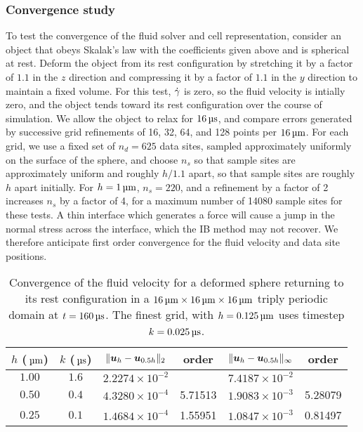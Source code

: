 \subsubsection{Convergence study}
To test the convergence of the fluid solver and cell representation, consider 
an object that obeys Skalak's law with the coefficients given above and is
spherical at rest. Deform the object from its rest configuration by stretching
it by a factor of $1.1$ in the $z$ direction and compressing it by a factor of
$1.1$ in the $y$ direction to maintain a fixed volume. For this test, $\dot{\gamma}$
is zero, so the fluid velocity is intially zero, and the object tends toward
its rest configuration over the course of simulation. We allow the object to
relax for $16\us$, and compare errors generated by successive grid refinements
of 16, 32, 64, and 128 points per $16\um$. For each grid, we use a fixed set of
$n_d=625$ data sites, sampled approximately uniformly on the surface of the
sphere, and choose $n_s$ so that sample sites are approximately uniform and
roughly $h/1.1$ apart, so that sample sites are roughly $h$ apart initially.
For $h=1\um$, $n_s=220$, and a refinement by a factor of 2 increases $n_s$ by a
factor of 4, for a maximum number of 14080 sample sites for these tests. A thin
interface which generates a force will cause a jump in the normal stress across
the interface, which the IB method may not recover. We therefore anticipate
first order convergence for the fluid velocity and data site positions.

\begin{table*}[ht]
    \begin{center}
        \begingroup
        \setlength{\tabcolsep}{9pt}
        \renewcommand{\arraystretch}{1.5}
        \begin{tabular}{cc|cc|cc}
                                                                                                                    \\ \toprule
            $h$ ($\um$) & $k$ ($\us$) & $\|\boldsymbol{u}_h-\boldsymbol{u}_{0.5h}\|_2$ & order   & $\|\boldsymbol{u}_h-\boldsymbol{u}_{0.5h}\|_{\infty}$ & order    \\ \midrule
            $1.00$      & $1.6$       & $2.2274\times10^{-2}$  &         & $7.4187\times10^{-2}$         &          \\
            $0.50$      & $0.4$       & $4.3280\times10^{-4}$  & 5.71513 & $1.9083\times10^{-3}$         & 5.28079  \\
            $0.25$      & $0.1$       & $1.4684\times10^{-4}$  & 1.55951 & $1.0847\times10^{-3}$         & 0.81497  \\ \bottomrule
        \end{tabular}
        \endgroup
    \end{center}
    \caption{%
Convergence of the fluid velocity for a deformed sphere returning to its rest
configuration in a $16\um\times16\um\times16\um$ triply periodic domain at
$t=160\us$. The finest grid, with $h=0.125\um$ uses timestep $k=0.025\us$.
    }
    \label{tab:u-convergence}
\end{table*}

